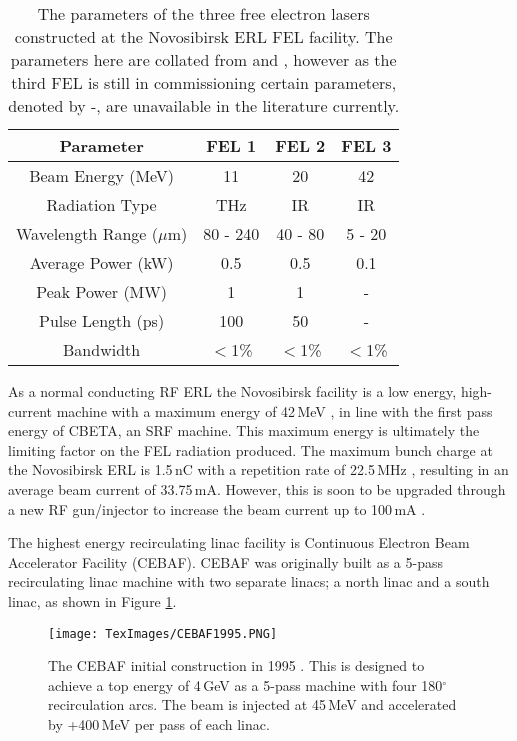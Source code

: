 \documentclass[11pt]{article}
\begin{document}
\begin{table}[H]
\centering
\begin{tabular}{|c||c|c|c|}
\hline
\textbf{Parameter} & \textbf{FEL 1} & \textbf{FEL 2} & \textbf{FEL 3} \\
\hline
Beam Energy (MeV) & 11 & 20 & 42 \\
\hline 
Radiation Type & THz & IR & IR \\
\hline
Wavelength Range ($\mu$m) & 80 - 240 & 40 - 80 & 5 - 20 \\
\hline
Average Power (kW) & 0.5 & 0.5 & 0.1 \\
\hline
Peak Power (MW) & 1 & 1 & - \\
\hline 
Pulse Length (ps) & 100 & 50 & -\\ 
\hline
Bandwidth & $<$1\% & $<$1\% & $<$1\% \\
\hline
\end{tabular}
\caption{\label{tab:NovosibirskFEL} The parameters of the three free electron lasers constructed at the Novosibirsk ERL FEL facility. The parameters here are collated from \cite{NovosibirskProcedia} and \cite{NovosibirskBullet}, however as the third FEL is still in commissioning certain parameters, denoted by -, are unavailable in the literature currently.}
\end{table}     

As a normal conducting RF ERL the Novosibirsk facility is a low energy, high-current machine with a maximum energy of 42\,MeV \cite{NovosibirskERL}, in line with the first pass energy of CBETA, an SRF machine. This maximum energy is ultimately the limiting factor on the FEL radiation produced. The maximum bunch charge at the Novosibirsk ERL is 1.5\,nC with a repetition rate of 22.5\,MHz \cite{NovosibirskIPAC}, resulting in an average beam current of 33.75\,mA. However, this is soon to be upgraded through a new RF gun/injector to increase the beam current up to 100\,mA \cite{NovosibirskGun}.

\vspace{5mm}

The highest energy recirculating linac facility is Continuous Electron Beam Accelerator Facility (CEBAF). CEBAF was originally built as a 5-pass recirculating linac machine with two separate linacs; a north linac and a south linac, as shown in Figure \ref{fig:CEBAF1995}.

\begin{figure}[H]
\centering
\texttt{[image: TexImages/CEBAF1995.PNG]}
\caption{\label{fig:CEBAF1995} The CEBAF initial construction in 1995 \cite{CEBAFRLegg}. This is designed to achieve a top energy of 4\,GeV as a 5-pass machine with four 180$^{\circ}$ recirculation arcs. The beam is injected at 45\,MeV and accelerated by +400\,MeV per pass of each linac.}
\end{figure}
\end{document}
